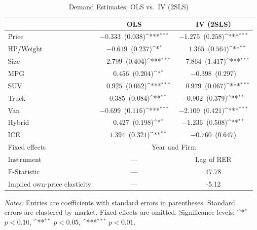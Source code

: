\documentclass[11pt]{article}
\begin{document}
\begin{table}[!htbp]
\centering
\begin{threeparttable}
\caption{Demand Estimates: OLS vs.\ IV (2SLS)}
\label{tab:ols_iv_demand}
\setlength{\tabcolsep}{8pt}
\renewcommand{\arraystretch}{1.15}
\newcommand{\sym}[1]{\ifmmode^{#1}\else\(^{#1}\)\fi}
\begin{tabular}{lcc}
\toprule
 & \textbf{OLS} & \textbf{IV (2SLS)} \\
\midrule
Price                 & $-0.333$ \,($0.038$)\sym{***} & $-1.275$ \,($0.258$)\sym{***} \\
HP/Weight             & $-0.619$ \,($0.237$)\sym{*}   & $\phantom{-}1.365$ \,($0.564$)\sym{**} \\
Size                  & $\phantom{-}2.799$ \,($0.404$)\sym{***} & $\phantom{-}7.864$ \,($1.417$)\sym{***} \\
MPG                   & $\phantom{-}0.456$ \,($0.204$)\sym{*}   & $-0.398$ \,($0.297$) \\
SUV                   & $\phantom{-}0.925$ \,($0.062$)\sym{***} & $\phantom{-}0.979$ \,($0.067$)\sym{***} \\
Truck                 & $\phantom{-}0.385$ \,($0.084$)\sym{**}  & $-0.902$ \,($0.379$)\sym{**} \\
Van                   & $-0.699$ \,($0.116$)\sym{***} & $-2.109$ \,($0.421$)\sym{***} \\
Hybrid                & $\phantom{-}0.427$ \,($0.198$)\sym{*}   & $-1.236$ \,($0.508$)\sym{**} \\
ICE                   & $\phantom{-}1.394$ \,($0.321$)\sym{**}  & $-0.760$ \,($0.647$) \\
\midrule
Fixed effects         & \multicolumn{2}{c}{Year and Firm} \\
Instrument            & — & Lag of RER \\
F-Statistic           & — & 47.78 \\
Implied own-price elasticity & — & -5.12 \\
\bottomrule
\end{tabular}
\begin{tablenotes}[flushleft]
\footnotesize
\item \textit{Notes:} Entries are coefficients with standard errors in parentheses. Standard errors are clustered by market. Fixed effects are omitted. Significance levels: \sym{*} $p<0.10$, \sym{**} $p<0.05$, \sym{***} $p<0.01$.
\end{tablenotes}
\end{threeparttable}
\end{table}
\end{document}
